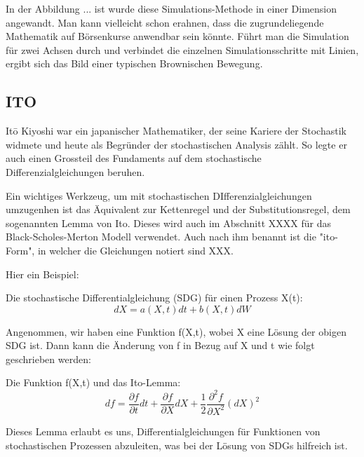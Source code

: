 In der Abbildung ... ist wurde diese Simulations-Methode in einer Dimension angewandt. Man kann vielleicht schon erahnen, dass die zugrundeliegende Mathematik auf Börsenkurse anwendbar sein könnte. Führt man die Simulation für zwei Achsen durch und verbindet die einzelnen Simulationsschritte mit Linien, ergibt sich das Bild einer typischen Brownischen Bewegung.


\subsection{ITO
\label{brown:ito}}
Itō Kiyoshi war ein japanischer Mathematiker, der seine Kariere der Stochastik widmete und heute als Begründer der stochastischen Analysis zählt. So legte er auch einen Grossteil des Fundaments auf dem stochastische Differenzialgleichungen beruhen.

Ein wichtiges Werkzeug, um mit stochastischen DIfferenzialgleichungen umzugenhen ist das Äquivalent zur Kettenregel und der Substitutionsregel, dem sogenannten Lemma von Ito. Dieses wird auch im Abschnitt XXXX für das Black-Scholes-Merton Modell verwendet. Auch nach ihm benannt ist die "ito-Form", in welcher die Gleichungen notiert sind XXX.

Hier ein Beispiel:

Die stochastische Differentialgleichung (SDG) für einen Prozess X(t):
\begin{equation}
	dX = a(X,t) dt + b(X,t) dW
\end{equation}

Angenommen, wir haben eine Funktion f(X,t), wobei X eine Lösung der obigen SDG ist. Dann kann die Änderung von f in Bezug auf X und t wie folgt geschrieben werden:

Die Funktion f(X,t) und das Ito-Lemma:
\begin{equation}
	df = \frac{\partial f}{\partial t} dt + \frac{\partial f}{\partial X} dX + \frac{1}{2} \frac{\partial^2 f}{\partial X^2} (dX)^2	
\end{equation}


Dieses Lemma erlaubt es uns, Differentialgleichungen für Funktionen von stochastischen Prozessen abzuleiten, was bei der Lösung von SDGs hilfreich ist.

